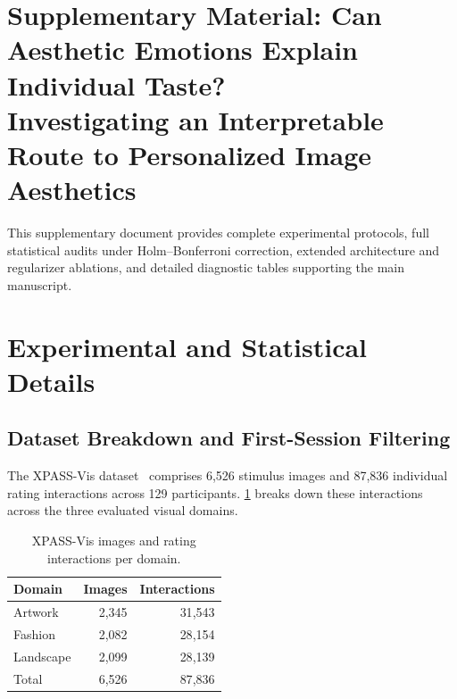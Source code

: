 \clearpage

\renewcommand{\thesection}{S\arabic{section}}
\renewcommand{\thetable}{S\arabic{table}}
\renewcommand{\thefigure}{S\arabic{figure}}
\renewcommand{\theequation}{S\arabic{equation}}
\setcounter{section}{0}
\setcounter{table}{0}
\setcounter{figure}{0}
\setcounter{equation}{0}

\section*{Supplementary Material: Can Aesthetic Emotions Explain Individual Taste? \\Investigating an Interpretable Route to Personalized Image Aesthetics}

This supplementary document provides complete experimental protocols, full statistical audits under Holm--Bonferroni correction, extended architecture and regularizer ablations, and detailed diagnostic tables supporting the main manuscript.

\section{Experimental and Statistical Details}
\label{sec:supp_exp_stat}
\subsection{Dataset Breakdown and First-Session Filtering}
The XPASS-Vis dataset~\cite{hayashi2026xpassvis} comprises 6,526 stimulus images and 87,836 individual rating interactions across 129 participants. \cref{tab:domain_counts} breaks down these interactions across the three evaluated visual domains. 

\begin{table}[h]
\centering
\caption{XPASS-Vis images and rating interactions per domain.}
\label{tab:domain_counts}
\begin{tabular}{lrr}
\toprule
Domain & Images & Interactions \\
\midrule
Artwork    & 2{,}345 & 31{,}543 \\
Fashion    & 2{,}082 & 28{,}154 \\
Landscape  & 2{,}099 & 28{,}139 \\
\midrule
Total      & 6{,}526 & 87{,}836 \\
\bottomrule
\end{tabular}
\end{table}

